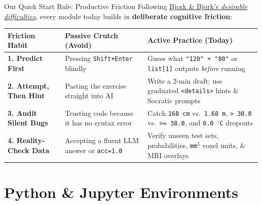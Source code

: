 \documentclass[aspectratio=169, 10pt]{beamer}
\begin{document}
\begin{frame}{Our Quick Start Rule: Productive Friction}
    \footnotesize
    Following \href{https://bjorklab.psych.ucla.edu/wp-content/uploads/sites/13/2016/04/EBjork_RBjork_2011.pdf}{Bjork \& Bjork's \textit{desirable difficulties}}, every module today builds in \textbf{deliberate cognitive friction}:
    \vspace{0.2cm}

    \begin{table}
        \centering
        \begin{tabular}{@{}p{}p{}p{}@{}}
            \toprule
            \textbf{Friction Habit} & \textbf{Passive Crutch (Avoid)} & \textbf{Active Practice (Today)} \\
            \midrule
            \textbf{1. Predict First} & Pressing \texttt{Shift+Enter} blindly & Guess what \texttt{"120" + "80"} or \texttt{list[1]} outputs \textit{before} running \\
            \textbf{2. Attempt, Then Hint} & Pasting the exercise straight into AI & Write a 2-min draft; use graduated \texttt{<details>} hints \& Socratic prompts \\
            \textbf{3. Audit Silent Bugs} & Trusting code because it has no syntax error & Catch \texttt{168 cm} vs.\ \texttt{1.68 m}, \texttt{> 38.0} vs.\ \texttt{>= 38.0}, and \texttt{0.0\,$^\circ$C} dropouts \\
            \textbf{4. Reality-Check Data} & Accepting a fluent LLM answer or \texttt{acc=1.0} & Verify unseen test sets, probabilities, \texttt{mm$^3$} voxel units, \& MRI overlays \\
            \bottomrule
        \end{tabular}
    \end{table}
\end{frame}

\section{Python \& Jupyter Environments}
\end{document}
